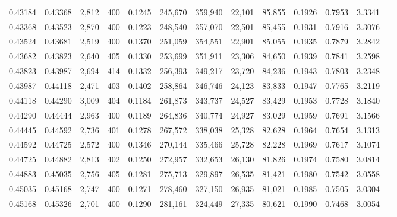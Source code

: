 \begin{tabular}{rrrrrrrrrrrrr}
0.43184 & 0.43368 & 2,812 & 400 &                                     0.1245 & 245,670 & 359,940 &  22,101 &  85,855 & 0.1926 & 0.7953 & 3.3341 \\
0.43368 & 0.43523 & 2,870 & 400 &                                     0.1223 & 248,540 & 357,070 &  22,501 &  85,455 & 0.1931 & 0.7916 & 3.3076 \\
0.43524 & 0.43681 & 2,519 & 400 &                                     0.1370 & 251,059 & 354,551 &  22,901 &  85,055 & 0.1935 & 0.7879 & 3.2842 \\
0.43682 & 0.43823 & 2,640 & 405 &                                     0.1330 & 253,699 & 351,911 &  23,306 &  84,650 & 0.1939 & 0.7841 & 3.2598 \\
0.43823 & 0.43987 & 2,694 & 414 &                                     0.1332 & 256,393 & 349,217 &  23,720 &  84,236 & 0.1943 & 0.7803 & 3.2348 \\
0.43987 & 0.44118 & 2,471 & 403 &                                     0.1402 & 258,864 & 346,746 &  24,123 &  83,833 & 0.1947 & 0.7765 & 3.2119 \\
0.44118 & 0.44290 & 3,009 & 404 &                                     0.1184 & 261,873 & 343,737 &  24,527 &  83,429 & 0.1953 & 0.7728 & 3.1840 \\
0.44290 & 0.44444 & 2,963 & 400 &                                     0.1189 & 264,836 & 340,774 &  24,927 &  83,029 & 0.1959 & 0.7691 & 3.1566 \\
0.44445 & 0.44592 & 2,736 & 401 &                                     0.1278 & 267,572 & 338,038 &  25,328 &  82,628 & 0.1964 & 0.7654 & 3.1313 \\
0.44592 & 0.44725 & 2,572 & 400 &                                     0.1346 & 270,144 & 335,466 &  25,728 &  82,228 & 0.1969 & 0.7617 & 3.1074 \\
0.44725 & 0.44882 & 2,813 & 402 &                                     0.1250 & 272,957 & 332,653 &  26,130 &  81,826 & 0.1974 & 0.7580 & 3.0814 \\
0.44883 & 0.45035 & 2,756 & 405 &                                     0.1281 & 275,713 & 329,897 &  26,535 &  81,421 & 0.1980 & 0.7542 & 3.0558 \\
0.45035 & 0.45168 & 2,747 & 400 &                                     0.1271 & 278,460 & 327,150 &  26,935 &  81,021 & 0.1985 & 0.7505 & 3.0304 \\
0.45168 & 0.45326 & 2,701 & 400 &                                     0.1290 & 281,161 & 324,449 &  27,335 &  80,621 & 0.1990 & 0.7468 & 3.0054 \\

\end{tabular}
